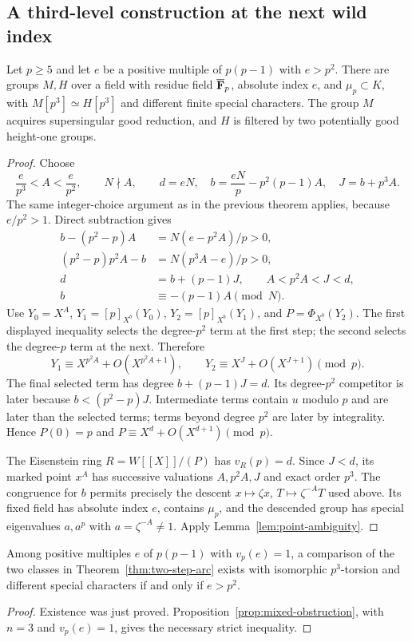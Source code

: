 \subsection{A third-level construction at the next wild index}
\begin{theorem}\label{thm:two-step-arc}
Let $p\ge5$ and let $e$ be a positive multiple of $p(p-1)$ with $e>p^2$. There are groups $M,H$ over a field with residue field $\overline{\mathbf F}_p$, absolute index $e$, and $\mu_p\subset K$, with $M[p^3]\simeq H[p^3]$ and different finite special characters. The group $M$ acquires supersingular good reduction, and $H$ is filtered by two potentially good height-one groups.
\end{theorem}
\begin{proof}
Choose
\[
 \frac{e}{p^3}<A<\frac{e}{p^2},\qquad N\nmid A,
 \qquad d=eN,\quad b=\frac{eN}{p}-p^2(p-1)A,
 \quad J=b+p^3A.
\]
The same integer-choice argument as in the previous theorem applies, because $e/p^2>1$. Direct subtraction gives
\begin{align*}
 b-(p^2-p)A&=N(e-p^2A)/p>0,\\
 (p^2-p)p^2A-b&=N(p^3A-e)/p>0,\\
 d&=b+(p-1)J,\qquad A<p^2A<J<d,\\
 b&\equiv-(p-1)A\pmod N.
\end{align*}
Use $Y_0=X^A$, $Y_1=[p]_{X^b}(Y_0)$, $Y_2=[p]_{X^b}(Y_1)$, and $P=\Phi_{X^b}(Y_2)$. The first displayed inequality selects the degree-$p^2$ term at the first step; the second selects the degree-$p$ term at the next. Therefore
\[
               Y_1\equiv X^{p^2A}+O(X^{p^2A+1}),\qquad
               Y_2\equiv X^J+O(X^{J+1})\pmod p.
\]
The final selected term has degree $b+(p-1)J=d$. Its degree-$p^2$ competitor is later because $b<(p^2-p)J$. Intermediate terms contain $u$ modulo $p$ and are later than the selected terms; terms beyond degree $p^2$ are later by integrality. Hence $P(0)=p$ and $P\equiv X^d+O(X^{d+1})\pmod p$.

The Eisenstein ring $R=W[[X]]/(P)$ has $v_R(p)=d$. Since $J<d$, its marked point $x^A$ has successive valuations $A,p^2A,J$ and exact order $p^3$. The congruence for $b$ permits precisely the descent $x\mapsto\zeta x$, $T\mapsto\zeta^{-A}T$ used above. Its fixed field has absolute index $e$, contains $\mu_p$, and the descended group has special eigenvalues $a,a^p$ with $a=\zeta^{-A}\ne1$. Apply Lemma~\ref{lem:point-ambiguity}.
\end{proof}

\begin{corollary}\label{cor:sharp-mixed-wild}
Among positive multiples $e$ of $p(p-1)$ with $v_p(e)=1$, a comparison of the two classes in Theorem~\ref{thm:two-step-arc} exists with isomorphic $p^3$-torsion and different special characters if and only if $e>p^2$.
\end{corollary}
\begin{proof}
Existence was just proved. Proposition~\ref{prop:mixed-obstruction}, with $n=3$ and $v_p(e)=1$, gives the necessary strict inequality.
\end{proof}

